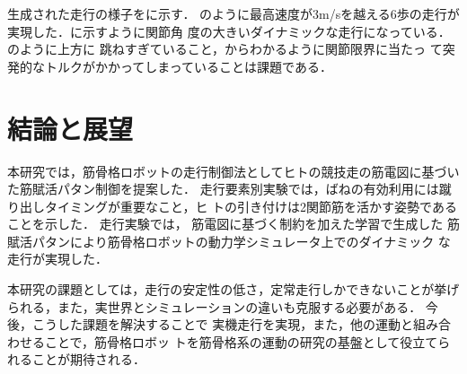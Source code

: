 \documentclass[10pt,a4paper]{jsarticle}
\begin{document}
生成された走行の様子をに示す．
のように最高速度が3m/sを越える6歩の走行が実現した．に示すように関節角
度の大きいダイナミックな走行になっている．のように上方に
跳ねすぎていること，からわかるように関節限界に当たっ
て突発的なトルクがかかってしまっていることは課題である．






\section{結論と展望}

本研究では，筋骨格ロボットの走行制御法としてヒトの競技走の筋電図に基づい
た筋賦活パタン制御を提案した．
走行要素別実験では，ばねの有効利用には蹴り出しタイミングが重要なこと，ヒ
トの引き付けは2関節筋を活かす姿勢であることを示した．
走行実験では，
筋電図に基づく制約を加えた学習で生成した
筋賦活パタンにより筋骨格ロボットの動力学シミュレータ上でのダイナミック
な走行が実現した．

本研究の課題としては，走行の安定性の低さ，定常走行しかできないことが挙げ
られる，また，実世界とシミュレーションの違いも克服する必要がある．
今後，こうした課題を解決することで
実機走行を実現，また，他の運動と組み合わせることで，筋骨格ロボッ
トを筋骨格系の運動の研究の基盤として役立てられることが期待される．
\end{document}

